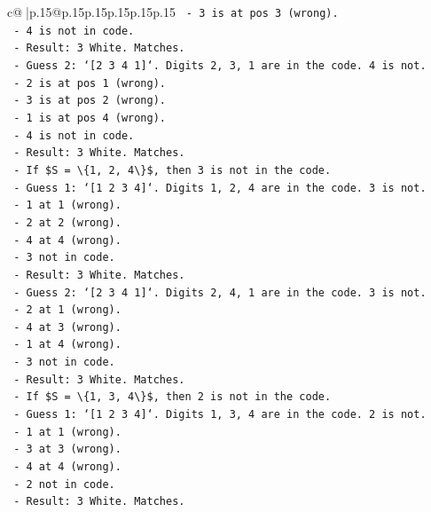 \documentclass{article}
\begin{document}
{\begin{supertabular}{c@{$\;$}|p{.15\linewidth}@{}p{.15\linewidth}p{.15\linewidth}p{.15\linewidth}p{.15\linewidth}p{.15\linewidth}}
{{{\texttt{      {-} 3 is at pos 3 (wrong).} \\
\texttt{      {-} 4 is not in code.} \\
\texttt{      {-} Result: 3 White. Matches.} \\
\texttt{    {-} Guess 2: `{[}2 3 4 1{]}`. Digits 2, 3, 1 are in the code. 4 is not.} \\
\texttt{      {-} 2 is at pos 1 (wrong).} \\
\texttt{      {-} 3 is at pos 2 (wrong).} \\
\texttt{      {-} 1 is at pos 4 (wrong).} \\
\texttt{      {-} 4 is not in code.} \\
\texttt{      {-} Result: 3 White. Matches.} \\
\texttt{  {-} If \$S = \textbackslash{}\{1, 2, 4\textbackslash{}\}\$, then 3 is not in the code.} \\
\texttt{    {-} Guess 1: `{[}1 2 3 4{]}`. Digits 1, 2, 4 are in the code. 3 is not.} \\
\texttt{      {-} 1 at 1 (wrong).} \\
\texttt{      {-} 2 at 2 (wrong).} \\
\texttt{      {-} 4 at 4 (wrong).} \\
\texttt{      {-} 3 not in code.} \\
\texttt{      {-} Result: 3 White. Matches.} \\
\texttt{    {-} Guess 2: `{[}2 3 4 1{]}`. Digits 2, 4, 1 are in the code. 3 is not.} \\
\texttt{      {-} 2 at 1 (wrong).} \\
\texttt{      {-} 4 at 3 (wrong).} \\
\texttt{      {-} 1 at 4 (wrong).} \\
\texttt{      {-} 3 not in code.} \\
\texttt{      {-} Result: 3 White. Matches.} \\
\texttt{  {-} If \$S = \textbackslash{}\{1, 3, 4\textbackslash{}\}\$, then 2 is not in the code.} \\
\texttt{    {-} Guess 1: `{[}1 2 3 4{]}`. Digits 1, 3, 4 are in the code. 2 is not.} \\
\texttt{      {-} 1 at 1 (wrong).} \\
\texttt{      {-} 3 at 3 (wrong).} \\
\texttt{      {-} 4 at 4 (wrong).} \\
\texttt{      {-} 2 not in code.} \\
\texttt{      {-} Result: 3 White. Matches.} \\
}}}
\end{supertabular}}
\end{document}
